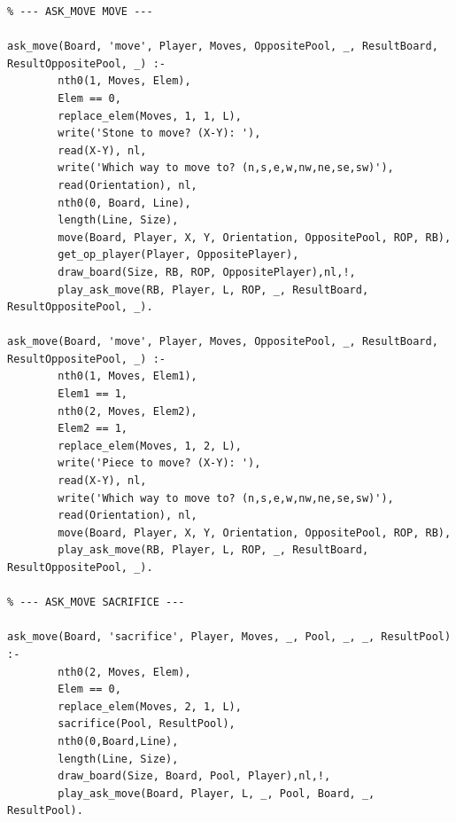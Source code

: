 \documentclass[a4paper]{article}
\begin{document}
\begin{lstlisting}
% --- ASK_MOVE MOVE ---

ask_move(Board, 'move', Player, Moves, OppositePool, _, ResultBoard, ResultOppositePool, _) :-
        nth0(1, Moves, Elem),
        Elem == 0,
        replace_elem(Moves, 1, 1, L),
        write('Stone to move? (X-Y): '),
        read(X-Y), nl,
        write('Which way to move to? (n,s,e,w,nw,ne,se,sw)'),
        read(Orientation), nl,
        nth0(0, Board, Line),
        length(Line, Size),
        move(Board, Player, X, Y, Orientation, OppositePool, ROP, RB),
        get_op_player(Player, OppositePlayer),
        draw_board(Size, RB, ROP, OppositePlayer),nl,!,
        play_ask_move(RB, Player, L, ROP, _, ResultBoard, ResultOppositePool, _).

ask_move(Board, 'move', Player, Moves, OppositePool, _, ResultBoard, ResultOppositePool, _) :-
        nth0(1, Moves, Elem1),
        Elem1 == 1,
        nth0(2, Moves, Elem2),
        Elem2 == 1,
        replace_elem(Moves, 1, 2, L),
        write('Piece to move? (X-Y): '),
        read(X-Y), nl,
        write('Which way to move to? (n,s,e,w,nw,ne,se,sw)'),
        read(Orientation), nl,
        move(Board, Player, X, Y, Orientation, OppositePool, ROP, RB),
        play_ask_move(RB, Player, L, ROP, _, ResultBoard, ResultOppositePool, _).

% --- ASK_MOVE SACRIFICE ---

ask_move(Board, 'sacrifice', Player, Moves, _, Pool, _, _, ResultPool) :- 
        nth0(2, Moves, Elem),
        Elem == 0,
        replace_elem(Moves, 2, 1, L),
        sacrifice(Pool, ResultPool),
        nth0(0,Board,Line),
        length(Line, Size),
        draw_board(Size, Board, Pool, Player),nl,!,
        play_ask_move(Board, Player, L, _, Pool, Board, _, ResultPool).
	\end{lstlisting}
\end{document}
